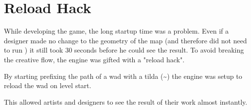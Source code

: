 \section{Reload Hack}
While developing the game, the long startup time was a problem. Even if a designer made no change to the geometry of the map (and therefore did not need to run ) it still took 30 seconds before he could see the result. To avoid breaking the creative flow, the engine was gifted with a "reload hack".\\
\par
By starting prefixing the path of a wad with a tilda (\textasciitilde) the engine was setup to reload the wad on level start.\\
\par
{}
\par
This allowed artists and designers to see the result of their work almost instantly.
